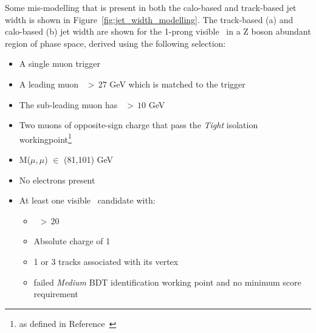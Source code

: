 	Some mis-modelling that is present in both the calo-based and track-based jet width is shown in Figure~\ref{fig:jet_width_modelling}. 
	The track-based (a) and calo-based (b) jet width are shown for the 1-prong visible \htau\ in a Z boson abundant region of phase space, derived using the following selection:
	\begin{itemize}
	\item A single muon trigger
	\item A leading muon \pt\ $>\,27$ GeV which is matched to the trigger
	\item The sub-leading muon  has \pt\ $>\,10$ GeV
	\item Two muons of opposite-sign charge that pass the \textit{Tight} isolation workingpoint\footnote{as defined in Reference~\cite{cite-key}}
	\item M($\mu,\mu$) $\in$ (81,101) GeV %
	\item No electrons present 
	\item At least one visible \htau\ candidate with: %
	\begin{itemize}
		\item \pt\ $>\,20$ \gev
		\item Absolute charge of 1 
		\item 1 or 3 tracks associated with its vertex
		\item failed \textit{Medium} \ac{BDT} identification working point and no minimum score requirement
	\end{itemize}
	\end{itemize}
	
